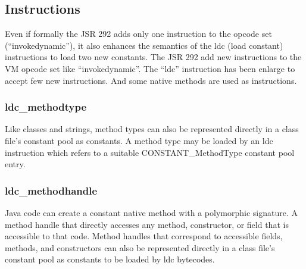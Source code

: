 \documentclass{sigplanconf}
\def \Jsr{JSR\xspace}
\def \JSR{\Jsr 292\xspace}
\def \VM{VM\xspace}
\begin{document}
% 


    \subsection{Instructions}
      Even if formally the \JSR adds only one instruction to the opcode set (``invokedynamic''),
      it also enhances the semantics of the ldc (load constant) instructions to load two new constants.
      The \JSR add new instructions to the \VM opcode set like ``invokedynamic''.
      The ``ldc'' instruction has been enlarge to accept few new instructions.
      And some native methods are used as instructions.

      \subsubsection{ldc\_methodtype}
        Like classes and strings, method types can also be
        represented directly in a class file's constant pool as constants.
        A method type may be loaded by an ldc instruction which refers to a suitable
        CONSTANT\_MethodType constant pool entry.

      \subsubsection{ldc\_methodhandle}
        Java code can create a constant native method with a polymorphic signature.
        A method handle that directly accesses any
        method, constructor, or field that is accessible to that code.
        Method handles that correspond to accessible fields, methods, and constructors
        can also be represented directly in a class file's constant pool
        as constants to be loaded by ldc bytecodes.
\end{document}
